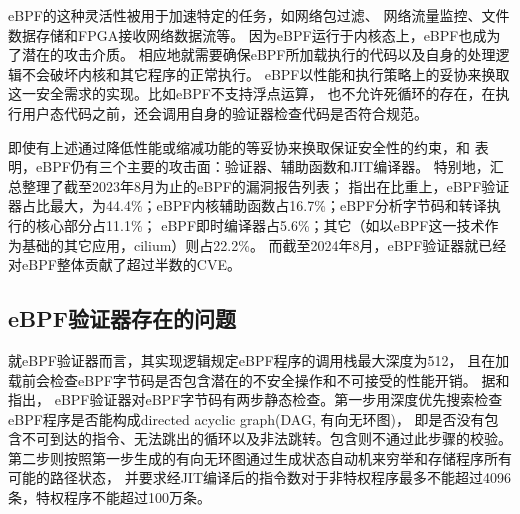 \documentclass[12pt,a4paper,dvipdfmx]{article}
\begin{document}
\begin{sloppypar}
\begin{CJK*}{UTF8}{song}
	eBPF的这种灵活性被用于加速特定的任务\cite{HaoValidating}，如网络包过滤\cite{10.1145/3371038,TCPdump}、
	网络流量监控\cite{9110434}、文件数据存储\cite{kernelStorage}和FPGA接收网络数据流\cite{258973}等。
	因为eBPF运行于内核态上，eBPF也成为了潜在的攻击介质\cite{LinuxEbpfProtection}。
	相应地就需要确保eBPF所加载执行的代码以及自身的处理逻辑不会破坏内核和其它程序的正常执行。
	eBPF以性能和执行策略上的妥协来换取这一安全需求的实现。比如eBPF不支持浮点运算\cite{10.1145/3674213.3674219}，
	也不允许死循环的存在\cite{riceLearningEBPFProgramming2023}，在执行用户态代码之前，还会调用自身的验证器检查代码是否符合规范。
	
	即使有上述通过降低性能或缩减功能的等妥协来换取保证安全性的约束，\textcite[62]{FuzzOnEBPF}和
	\textcite{mohamedUnderstandingSecurityLinux2023}表明，eBPF仍有三个主要的攻击面：验证器、辅助函数和JIT编译器。
	特别地，\textcite{mohamedUnderstandingSecurityLinux2023}汇总整理了截至2023年8月为止的eBPF的漏洞报告列表；
	指出在比重上，eBPF验证器占比最大，为44.4\%；eBPF内核辅助函数占16.7\%；eBPF分析字节码和转译执行的核心部分占11.1\%；
	eBPF即时编译器占5.6\%；其它（如以eBPF这一技术作为基础的其它应用，cilium）则占22.2\%。
	而截至2024年8月，eBPF验证器就已经对eBPF整体贡献了超过半数的CVE\cite{hive}。

	\subsection{eBPF验证器存在的问题}
	就eBPF验证器而言，其实现逻辑规定eBPF程序的调用栈最大深度为512\cite[30]{riceLearningEBPFProgramming2023}，
	且在加载前会检查eBPF字节码是否包含潜在的不安全操作和不可接受的性能开销\cite{PKSeBPFIsolation}。
	据\textcite{limSafeBPFHardwareassistedDefenseindepth2024}和\textcite[6]{vieiraFastPacketProcessing2021}指出，
	eBPF验证器对eBPF字节码有两步静态检查。第一步用深度优先搜索检查eBPF程序是否能构成directed acyclic graph(DAG, 有向无环图)，
	即是否没有包含不可到达的指令、无法跳出的循环以及非法跳转。包含则不通过此步骤的校验。
	第二步则按照第一步生成的有向无环图通过生成状态自动机来穷举和存储程序所有可能的路径状态，
	并要求经JIT编译后的指令数对于非特权程序最多不能超过4096条，特权程序不能超过100万条。
	

\end{CJK*}
\end{sloppypar}
\end{document}
